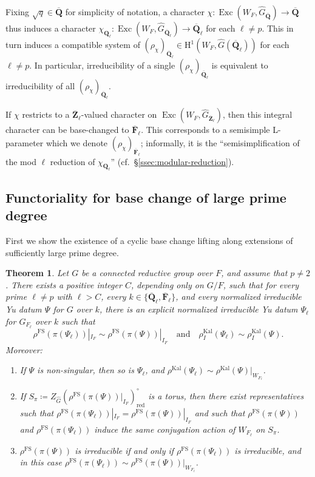 \documentclass[reqno]{amsart}
\numberwithin{equation}{subsection}
\newcommand{\F}{\mathbf{F}}
\newcommand{\Q}{\mathbf{Q}}
\newcommand{\Z}{\mathbf{Z}}
\newcommand{\ol}[1]{\overline{#1}}
\newcommand{\wh}[1]{\widehat{#1}}
\newcommand{\co}{\colon}
\DeclareMathOperator{\Exc}{Exc}
\DeclareMathOperator{\FS}{FS}
\DeclareMathOperator{\red}{red}
\DeclareMathOperator{\Kal}{Kal}
\newcommand{\rH}{\ensuremath{\mathrm{H}}\xspace}
\newtheorem{thm}{Theorem}[subsection]
\theoremstyle{remark}
\numberwithin{equation}{subsection}
\numberwithin{figure}{subsection}
\begin{document}
Fixing $\sqrt{q} \in \ol \Q$ for simplicity of notation, a character $\chi \co \Exc(W_F, \wh G_{\ol \Q}) \rightarrow \ol \Q$ thus induces a character $\chi_{\Q_\ell} \co \Exc(W_F, \wh G_{\ol \Q_\ell}) \rightarrow \ol \Q_\ell$ for each $\ell \neq p$. This in turn induces a compatible system of $(\rho_{\chi})_{\ol \Q_\ell} \in \rH^1(W_F, \wh G(\ol \Q_\ell))$ for each $\ell \neq p$.
In particular, irreducibility of a single $(\rho_{\chi})_{\ol \Q_\ell}$ is equivalent to irreducibility of all $(\rho_{\chi})_{\ol \Q_\ell}$.

If $\chi$ restricts to a $\ol \Z_\ell$-valued character on $\Exc(W_F, \wh G_{\ol \Z_\ell})$, then this integral character can be base-changed to $\ol \F_\ell$. This corresponds to a semisimple L-parameter which we denote $(\rho_{\chi})_{\ol \F_\ell}$; informally, it is the ``semisimplification of the mod $\ell$ reduction of $\chi_{\Q_\ell}$'' (cf.\ \S \ref{ssec:modular-reduction}).











\subsection{Functoriality for base change of large prime degree}


First we show the existence of a cyclic base change lifting along extensions of sufficiently large prime degree.

\begin{thm}\label{thm:base-change-functoriality}
Let $G$ be a connected reductive group over $F$, and assume that $p\neq2$. There exists a positive integer $C$, depending only on $G/F$, such that for every prime $\ell\neq p$ with $\ell>C$, every $k\in\{\ol\Q_\ell,\ol\F_\ell\}$, and every normalized irreducible Yu datum $\Psi$ for $G$ over $k$, there is an explicit normalized irreducible Yu datum $\Psi_\ell$ for $G_{F_\ell}$ over $k$ such that
\[
\rho^{\FS}(\pi(\Psi_\ell))|_{I_F} \sim \rho^{\FS}(\pi(\Psi))|_{I_F}\quad \text{and} \quad \rho_I^{\Kal}(\Psi_\ell) \sim \rho_I^{\Kal}(\Psi).
\]
Moreover:
\begin{enumerate}
\item If $\Psi$ is non-singular, then so is $\Psi_\ell$, and $\rho^{\Kal}(\Psi_\ell) \sim \rho^{\Kal}(\Psi)|_{W_{F_\ell}}$.

\item If $S_\pi\coloneqq Z_{\wh G}(\rho^{\FS}(\pi(\Psi))|_{I_F})^\circ_{\red}$ is a torus, then there exist representatives such that $\rho^{\FS}(\pi(\Psi_\ell))|_{I_F} = \rho^{\FS}(\pi(\Psi))|_{I_F}$ and such that $\rho^{\FS}(\pi(\Psi))$ and $\rho^{\FS}(\pi(\Psi_\ell))$ induce the same conjugation action of $W_{F_\ell}$ on $S_\pi$.

\item $\rho^{\FS}(\pi(\Psi))$ is irreducible if and only if $\rho^{\FS}(\pi(\Psi_\ell))$ is irreducible, and in this case $\rho^{\FS}(\pi(\Psi_\ell)) \sim \rho^{\FS}(\pi(\Psi))|_{W_{F_\ell}}$. 
\end{enumerate}
\end{thm}
\end{document}
